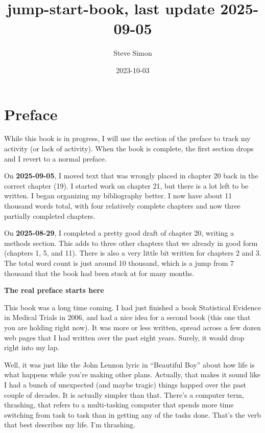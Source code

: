 \documentclass[
  letterpaper,
  DIV=11,
  numbers=noendperiod]{scrreprt}
\title{jump-start-book, last update 2025-09-05}
\author{Steve Simon}
\date{2023-10-03}
\renewcommand*\contentsname{Table of contents}
\newcommand\contentsname{Table of contents}
\begin{document}
\maketitle

\renewcommand*\contentsname{Table of contents}
{
\hypersetup{linkcolor=}
\setcounter{tocdepth}{2}
\tableofcontents
}


\chapter*{Preface}\label{preface}


While this book is in progress, I will use the section of the preface to
track my activity (or lack of activity). When the book is complete, the
first section drops and I revert to a normal preface.

On \textbf{2025-09-05}, I moved text that was wrongly placed in chapter
20 back in the correct chapter (19). I started work on chapter 21, but
there is a lot left to be written. I began organizing my bibliography
better. I now have about 11 thousand words total, with four relatively
complete chapters and now three partially completed chapters.

On \textbf{2025-08-29}, I completed a pretty good draft of chapter 20,
writing a methods section. This adds to three other chapters that we
already in good form (chapters 1, 5, and 11). There is also a very
little bit written for chapters 2 and 3. The total word count is just
around 10 thousand, which is a jump from 7 thousand that the book had
been stuck at for many months.

\textbf{The real preface starts here}

This book was a long time coming. I had just finished a book Statistical
Evidence in Medical Trials in 2006, and had a nice idea for a second
book (this one that you are holding right now). It was more or less
written, spread across a few dozen web pages that I had written over the
past eight years. Surely, it would drop right into my lap.

Well, it was just like the John Lennon lyric in ``Beautiful Boy'' about
how life is what happens while you're making other plans. Actually, that
makes it sound like I had a bunch of unexpected (and maybe tragic)
things happed over the past couple of decades. It is actually simpler
than that. There's a computer term, thrashing, that refers to a
multi-tasking computer that spends more time switching from task to task
than in getting any of the tasks done. That's the verb that best
describes my life. I'm thrashing.
\end{document}
